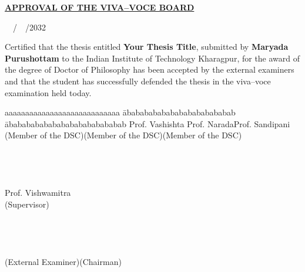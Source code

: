 {\fontsize{11pt}{13pt}\selectfont
\newpage
\thispagestyle{empty}
 \vspace*{2cm}
\begin{center}
\textbf{\Large\underline {APPROVAL OF THE VIVA--VOCE BOARD}}
\end{center}
\begin{flushright}
\ \ /\ \ /2032
\end{flushright}
\vspace{1.cm}
Certified that the thesis entitled \textbf{Your Thesis Title}, submitted by \textbf{Maryada Purushottam} to the Indian Institute of Technology Kharagpur, for the award of the degree of Doctor of Philosophy has been accepted by the external examiners and that the student has successfully defended the thesis in the viva--voce examination held today.
\vspace{2.cm}
\begin{tabbing}
aaaaaaaaaaaaaaaaaaaaaaaaaaaa \= ababababababababababababab \= abababababababababababababab \kill
Prof. Vashishta \> Prof. Narada\>Prof. Sandipani\\ %
(Member of the DSC)\>(Member of the DSC)\>(Member of the DSC)\\\\\\\\\\
Prof. Vishwamitra\\
(Supervisor)\\\\\\\\\\
(External Examiner)\>\>(Chairman)\\
\end{tabbing} 
}